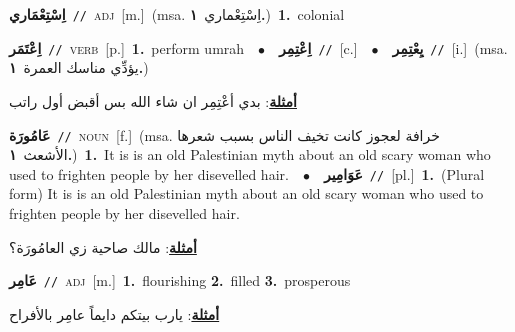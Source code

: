 \documentclass[10pt,a4paper,twoside]{article} %
\begin{document}
\begin{multicols}{2}
{\setlength\topsep{0pt}\textbf{\foreignlanguage{arabic}{اِسْتِعْمَاري}}\ {\color{gray}\texttt{//}\color{black}}\ \textsc{adj}\ [m.]\ \color{gray}(msa. \foreignlanguage{arabic}{اِسْتِعْماري}~\foreignlanguage{arabic}{\textbf{١.}})\color{black}\ \textbf{1.}~colonial\ } \vspace{2mm}

{\setlength\topsep{0pt}\textbf{\foreignlanguage{arabic}{اِعْتَمَر}}\ {\color{gray}\texttt{//}\color{black}}\ \textsc{verb}\ [p.]\ \textbf{1.}~perform umrah\ \ $\bullet$\ \ \setlength\topsep{0pt}\textbf{\foreignlanguage{arabic}{اِعْتِمِر}}\ {\color{gray}\texttt{//}\color{black}}\ [c.]\ \ $\bullet$\ \ \setlength\topsep{0pt}\textbf{\foreignlanguage{arabic}{يِعْتِمِر}}\ {\color{gray}\texttt{//}\color{black}}\ [i.]\ \color{gray}(msa. \foreignlanguage{arabic}{يؤدِّي مناسك العمرة}~\foreignlanguage{arabic}{\textbf{١.}})\color{black}\  \begin{flushright}\color{gray}\foreignlanguage{arabic}{\textbf{\underline{\foreignlanguage{arabic}{أمثلة}}}: بدي أعْتِمِر ان شاء الله بس أقبض أول راتب}\end{flushright}\color{black}} \vspace{2mm}

{\setlength\topsep{0pt}\textbf{\foreignlanguage{arabic}{عَامُورَة}}\ {\color{gray}\texttt{//}\color{black}}\ \textsc{noun}\ [f.]\ \color{gray}(msa. \foreignlanguage{arabic}{خرافة لعجوز كانت تخيف الناس بسبب شعرها الأشعث}~\foreignlanguage{arabic}{\textbf{١.}})\color{black}\ \textbf{1.}~It is is an old Palestinian myth about an old scary woman who used to frighten people by her disevelled hair.\ \ $\bullet$\ \ \setlength\topsep{0pt}\textbf{\foreignlanguage{arabic}{عَوَامِير}}\ {\color{gray}\texttt{//}\color{black}}\ [pl.]\ \textbf{1.}~(Plural form) It is is an old Palestinian myth about an old scary woman who used to frighten people by her disevelled hair.\  \begin{flushright}\color{gray}\foreignlanguage{arabic}{\textbf{\underline{\foreignlanguage{arabic}{أمثلة}}}: مالك صاحية زي العامُورَة؟}\end{flushright}\color{black}} \vspace{2mm}

{\setlength\topsep{0pt}\textbf{\foreignlanguage{arabic}{عَامِر}}\ {\color{gray}\texttt{//}\color{black}}\ \textsc{adj}\ [m.]\ \textbf{1.}~flourishing  \textbf{2.}~filled  \textbf{3.}~prosperous\  \begin{flushright}\color{gray}\foreignlanguage{arabic}{\textbf{\underline{\foreignlanguage{arabic}{أمثلة}}}: يارب بيتكم دايماً عامِر بالأفراح}\end{flushright}\color{black}} \vspace{2mm}


\end{multicols}
\end{document}
